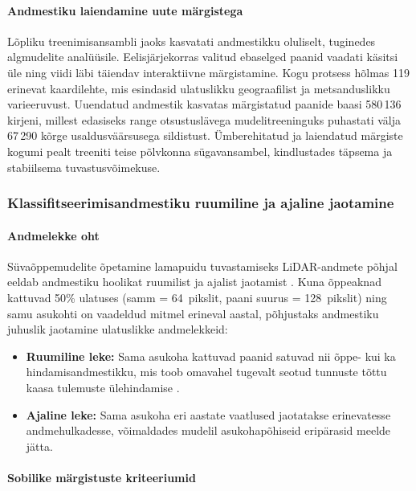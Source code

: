     \paragraph{Andmestiku laiendamine uute märgistega}
    Lõpliku treenimisansambli jaoks kasvatati andmestikku oluliselt, tuginedes algmudelite analüüsile. Eelisjärjekorras valitud ebaselged paanid vaadati käsitsi üle ning viidi läbi täiendav interaktiivne märgistamine. Kogu protsess hõlmas 119 erinevat kaardilehte, mis esindasid ulatuslikku geograafilist ja metsanduslikku varieeruvust. Uuendatud andmestik kasvatas märgistatud paanide baasi 580\,136 kirjeni, millest edasiseks range otsustuslävega mudelitreeninguks puhastati välja 67\,290 kõrge usaldusväärsusega sildistust. Ümberehitatud ja laiendatud märgiste kogumi pealt treeniti teise põlvkonna sügavansambel, kindlustades täpsema ja stabiilsema tuvastusvõimekuse.

    \subsubsection{Klassifitseerimisandmestiku ruumiline ja ajaline jaotamine}
    \label{spatial-split}

    \paragraph{Andmelekke oht} Süvaõppemudelite õpetamine lamapuidu tuvastamiseks LiDAR-andmete põhjal eeldab andmestiku hoolikat ruumilist ja ajalist jaotamist \parencite{roberts_crossvalidation_2017}. Kuna õppeaknad kattuvad 50\% ulatuses (samm = 64~pikslit, paani suurus = 128~pikslit) ning samu asukohti on vaadeldud mitmel erineval aastal, põhjustaks andmestiku juhuslik jaotamine ulatuslikke andmelekkeid:
    \begin{itemize}
        \item \textbf{Ruumiline leke:} Sama asukoha kattuvad paanid satuvad nii õppe- kui ka hindamisandmestikku, mis toob omavahel tugevalt seotud tunnuste tõttu kaasa tulemuste ülehindamise \parencite{kattenborn_spatially_2022}.
        \item \textbf{Ajaline leke:} Sama asukoha eri aastate vaatlused jaotatakse erinevatesse andmehulkadesse, võimaldades mudelil asukohapõhiseid eripärasid meelde jätta.
    \end{itemize}

    \paragraph{Sobilike märgistuste kriteeriumid}

